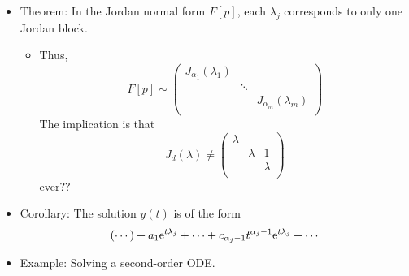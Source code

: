 \documentclass[../notes.tex]{subfiles}
\begin{document}
\begin{itemize}
\begin{itemize}
\begin{proof}
\begin{align*}
            \end{align*}
            as desired.
        \end{proof}
        \item Roots of $p(z)$ are the eigenvalues of $F[p]$ and $C[p]$.
        \item We have that $C[p]e_i=e_{i+1}$ for $i=1,\dots,n-1$ and
        \begin{equation*}
            C[p]e_n = -a_0e_1-\cdots-a_{n-1}e_n
        \end{equation*}
        which implies that if $r(z)/\deg r<n$ nullifies $C[p]$, then necessarily $r(z)=p(z)$ since $(z-\lambda_j)^{<\alpha_j}$??
    \end{itemize}
    \item Theorem: In the Jordan normal form $F[p]$, each $\lambda_j$ corresponds to only one Jordan block.
    \begin{itemize}
        \item Thus,
        \begin{equation*}
            F[p] \sim
            \begin{pmatrix}
                J_{\alpha_1}(\lambda_1) &  & \\
                 & \ddots & \\
                 &  & J_{\alpha_m}(\lambda_m)\\
            \end{pmatrix}
        \end{equation*}
        The implication is that
        \begin{equation*}
            J_d(\lambda) \neq
            \begin{pmatrix}
                \lambda &  & \\
                 & \lambda & 1\\
                 &  & \lambda\\
            \end{pmatrix}
        \end{equation*}
        ever??
    \end{itemize}
    \item Corollary: The solution $y(t)$ is of the form
    \begin{equation*}
        (\cdots)+a_1\e[t\lambda_j]+\cdots+c_{\alpha_j-1}t^{\alpha_j-1}\e[t\lambda_j]+\cdots
    \end{equation*}
    \item Example: Solving a second-order ODE.
    \begin{equation*}

\end{equation*}
\end{itemize}
\end{document}

